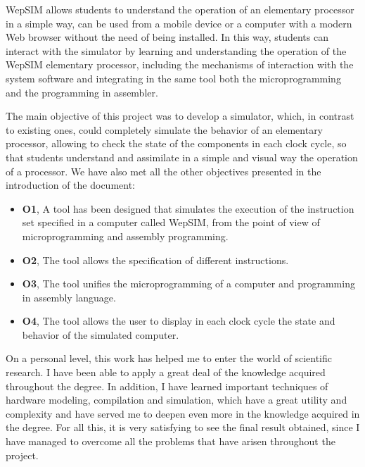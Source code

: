 WepSIM allows students to understand the operation of an elementary processor in a simple way, can be used from a mobile device or a computer with a modern Web browser without the need of being installed. In this way, students can interact with the simulator by learning and understanding the operation of the WepSIM elementary processor, including the mechanisms of interaction with the system software and integrating in the same tool both the microprogramming and the programming in assembler.

The main objective of this project was to develop a simulator, which, in contrast to existing ones, could completely simulate the behavior of an elementary processor, allowing to check the state of the components in each clock cycle, so that students understand and assimilate in a simple and visual way the operation of a processor. We have also met all the other objectives presented in the introduction of the document:

\begin{itemize}

\item \textbf{O1}, A tool has been designed that simulates the execution of the instruction set specified in a computer called WepSIM, from the point of view of microprogramming and assembly programming.

\item \textbf{O2}, The tool allows the specification of different instructions.

\item \textbf{O3}, The tool unifies the microprogramming of a computer and programming in assembly language.

\item \textbf{O4}, The tool allows the user to display in each clock cycle the state and behavior of the simulated computer.

\end{itemize}

On a personal level, this work has helped me to enter the world of scientific research. I have been able to apply a great deal of the knowledge acquired throughout the degree. In addition, I have learned important techniques of hardware modeling, compilation and simulation, which have a great utility and complexity and have served me to deepen even more in the knowledge acquired in the degree. For all this, it is very satisfying to see the final result obtained, since I have managed to overcome all the problems that have arisen throughout the project.

